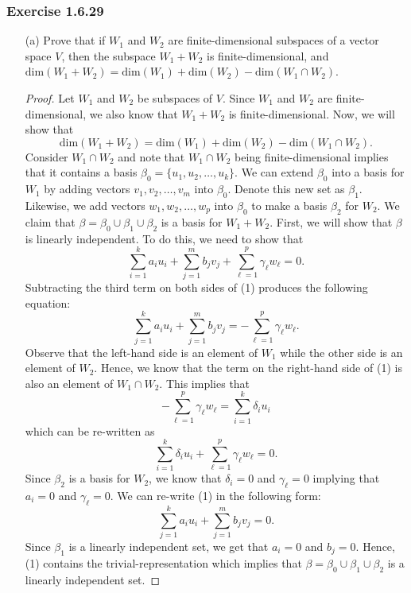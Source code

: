 \subsubsection{Exercise 1.6.29} 
\begin{enumerate}
    \item[(a)] Prove that if \( W_{1}  \) and \( W_{2}  \) are finite-dimensional subspaces of a vector space \( V  \), then the subspace \( W_{1} + W_{2} \) is finite-dimensional, and \( \text{dim}(W_{1} + W_{2}) = \text{dim}(W_{1}) + \text{dim}(W_{2}) - \text{dim}(W_{1} \cap W_{2}) \).
        \begin{proof}
        Let \( W_{1} \) and \( W_{2} \) be subspaces of \( V \). Since \( W_{1}  \) and \( W_{2} \) are finite-dimensional, we also know that \( W_{1} + W_{2}  \) is finite-dimensional. Now, we will show that  
        \[  \text{dim}(W_{1} + W_{2}) = \text{dim}(W_{1}) +  \text{dim}(W_{2}) - \text{dim}(W_{1} \cap W_{2}). \]
        Consider \( W_{1} \cap W_{2} \) and note that \( W_{1} \cap W_{2} \) being finite-dimensional implies that it contains a basis \( \beta_{0} = \{ u_{1}, u_{2}, \dots, u_{k }  \}  \). We can extend \( \beta_{0} \) into a basis for \( W_{1} \) by adding vectors \( v_{1}, v_{2}, \dots, v_{m}  \) into \( \beta_{0} \). Denote this new set as \( \beta_{1} \). Likewise, we add vectors \( w_{1}, w_{2}, \dots, w_{p}   \) into \( \beta_{0}  \) to make a basis \( \beta_{2} \) for \( W_{2} \). We claim that \( \beta = \beta_{0} \cup \beta_{1} \cup \beta_{2} \) is a basis for \( W_{1} + W_{2} \). First, we will show that \( \beta \) is linearly independent. To do this, we need to show that 
        \[  \sum_{ i=1 }^{ k  } a_{i} u_{i} + \sum_{ j=1 }^{ m } b_{j} v_{j} + \sum_{ \ell = 1  }^{ p  } \gamma_{\ell} w_{\ell} = 0. \tag{1} \]
        Subtracting the third term on both sides of (1) produces the following equation:
        \[ \sum_{ j=1 }^{ k  } a_{i} u_{i} + \sum_{ j=1 }^{ m } b_{j} v_{j} = - \sum_{ \ell =1  }^{ p } \gamma_{\ell} w_{\ell}. \]
        Observe that the left-hand side is an element of \( W_{1} \) while the other side is an element of \( W_{2} \). Hence, we know that the term on the right-hand side of (1) is also an element of \( W_{1} \cap W_{2} \). This implies that 
        \[  - \sum_{ \ell = 1  }^{ p } \gamma_{\ell} w_{\ell} = \sum_{ i=1 }^{ k  } \delta_{i} u_{i} \]
        which can be re-written as 
        \[  \sum_{ i=1 }^{ k  } \delta_{i} u_{i} + \sum_{ \ell = 1  }^{ p } \gamma_{\ell} w_{\ell} = 0. \]
        Since \( \beta_{2} \) is a basis for \( W_{2} \), we know that \( \delta_{i} = 0  \) and \( \gamma_{\ell } = 0  \) implying that \( a_{i} = 0  \) and \( \gamma_{\ell} = 0  \). We can re-write (1) in the following form:
        \[  \sum_{ j=1 }^{ k  } a_{i} u_{i} + \sum_{ j=1 }^{ m }b_{j} v_{j} = 0. \tag{2} \]
        Since \( \beta_{1}  \) is a linearly independent set, we get that \( a_{i} = 0  \) and \( b_{j} = 0  \). Hence, (1) contains the trivial-representation which implies that \( \beta = \beta_{0} \cup \beta_{1} \cup \beta_{2}  \) is a linearly independent set.


\end{proof}
\end{enumerate}
